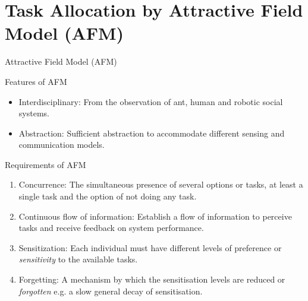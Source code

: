 \documentclass{beamer}
\begin{document}
\section{Task Allocation by Attractive Field Model (AFM)}
\begin{frame}[t]{Attractive Field Model (AFM)}	
\begin{block}{Features of AFM}
\begin{itemize}
\item \alert{Interdisciplinary:} \small From the observation of ant, human and robotic social systems. 
\item \alert{Abstraction:} \small Sufficient abstraction to accommodate different sensing and communication models.
\end{itemize}
\end{block}
  	
\begin{block}{Requirements of AFM}
\begin{enumerate}
\item \normalsize  \alert{Concurrence:} \small The simultaneous presence of several options or tasks, at least a single task and the option of not doing any task. 
\item \normalsize  \alert{Continuous flow of information:} \small Establish a flow of information to perceive tasks and receive feedback on system performance.
\item \normalsize  \alert{Sensitization:} \small Each individual must have different levels of preference or {\em sensitivity} to the available tasks.
\item \normalsize  \alert{Forgetting:} \small A mechanism by which the sensitisation levels are reduced or {\em forgotten} e.g. a slow general decay of sensitisation.
\end{enumerate}
\end{block}  	
\end{frame}
\end{document}
